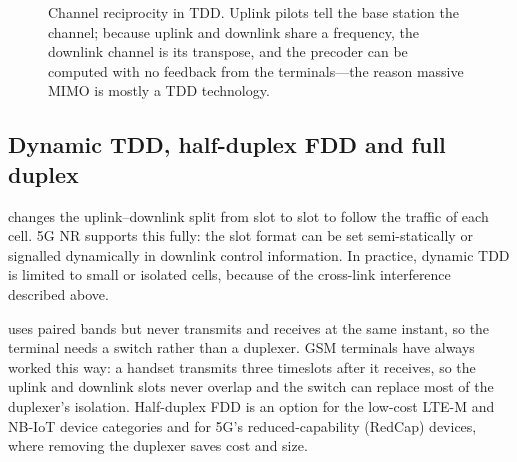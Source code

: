 \begin{figure}[htbp]\centering
{}
\caption{Channel reciprocity in TDD. Uplink pilots tell the base station the channel; because uplink and downlink
share a frequency, the downlink channel is its transpose, and the precoder can be computed with no feedback from the
terminals---the reason massive MIMO is mostly a TDD technology.}
\label{fig:ch20_reciprocity}
\end{figure}

\subsection{Dynamic TDD, half-duplex FDD and full duplex}

 changes the uplink--downlink split from slot to slot to follow the traffic of
each cell. 5G NR supports this fully: the slot format can be set semi-statically or signalled
dynamically in downlink control information. In practice, dynamic TDD is limited to small or
isolated cells, because of the cross-link interference described above.

 uses paired bands but never transmits and receives at the same instant,
so the terminal needs a switch rather than a duplexer. GSM terminals have always worked this
way: a handset transmits three timeslots after it receives, so the uplink and downlink slots
never overlap and the switch can replace most of the duplexer's isolation. Half-duplex FDD is
an option for the low-cost LTE-M and NB-IoT device categories and for 5G's reduced-capability
(RedCap) devices, where removing the duplexer saves cost and size.

